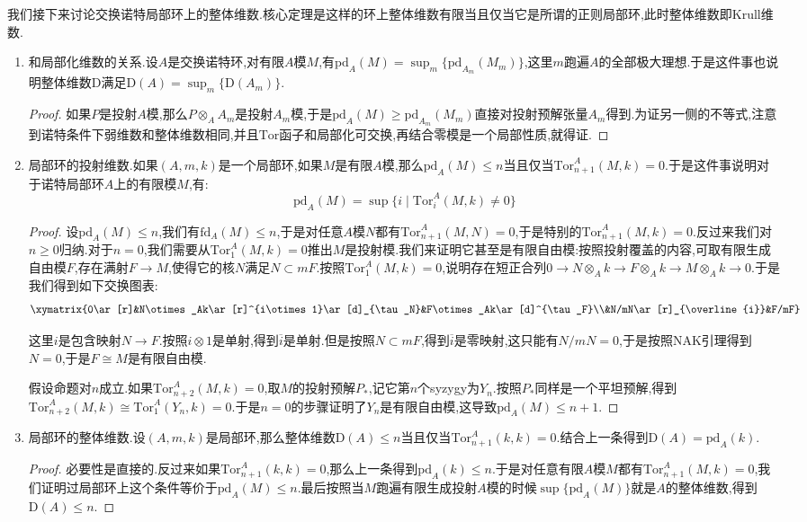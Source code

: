 我们接下来讨论交换诺特局部环上的整体维数.核心定理是这样的环上整体维数有限当且仅当它是所谓的正则局部环,此时整体维数即Krull维数.
\begin{enumerate}
	\item 和局部化维数的关系.设$A$是交换诺特环,对有限$A$模$M$,有$\mathrm{pd}_A(M)=\sup_m\{\mathrm{pd}_{A_m}(M_m)\}$,这里$m$跑遍$A$的全部极大理想.于是这件事也说明整体维数$\mathrm{D}$满足$\mathrm{D}(A)=\sup_m\{\mathrm{D}(A_m)\}$.
	\begin{proof}
		
		如果$P$是投射$A$模,那么$P\otimes_AA_m$是投射$A_m$模,于是$\mathrm{pd}_A(M)\ge\mathrm{pd}_{A_m}(M_m)$直接对投射预解张量$A_m$得到.为证另一侧的不等式,注意到诺特条件下弱维数和整体维数相同,并且$\mathrm{Tor}$函子和局部化可交换,再结合零模是一个局部性质,就得证.
	\end{proof}
    \item 局部环的投射维数.如果$(A,m,k)$是一个局部环,如果$M$是有限$A$模,那么$\mathrm{pd}_A(M)\le n$当且仅当$\mathrm{Tor}_{n+1}^A(M,k)=0$.于是这件事说明对于诺特局部环$A$上的有限模$M$,有:
    $$\mathrm{pd}_A(M)=\sup\{i\mid\mathrm{Tor}_i^A(M,k)\not=0\}$$
    \begin{proof}
    	
    	设$\mathrm{pd}_A(M)\le n$,我们有$\mathrm{fd}_A(M)\le n$,于是对任意$A$模$N$都有$\mathrm{Tor}_{n+1}^A(M,N)=0$,于是特别的$\mathrm{Tor}_{n+1}^A(M,k)=0$.反过来我们对$n\ge0$归纳.对于$n=0$,我们需要从$\mathrm{Tor}_1^A(M,k)=0$推出$M$是投射模.我们来证明它甚至是有限自由模:按照投射覆盖的内容,可取有限生成自由模$F$,存在满射$F\to M$,使得它的核$N$满足$N\subset mF$.按照$\mathrm{Tor}_1^A(M,k)=0$,说明存在短正合列$0\to N\otimes_Ak\to F\otimes_Ak\to M\otimes_Ak\to0$.于是我们得到如下交换图表:
    	$$\xymatrix{0\ar[r]&N\otimes_Ak\ar[r]^{i\otimes1}\ar[d]_{\tau_N}&F\otimes_Ak\ar[d]^{\tau_F}\\&N/mN\ar[r]_{\overline{i}}&F/mF}$$
    	
    	这里$i$是包含映射$N\to F$.按照$i\otimes1$是单射,得到$\overline{i}$是单射.但是按照$N\subset mF$,得到$\overline{i}$是零映射,这只能有$N/mN=0$,于是按照NAK引理得到$N=0$,于是$F\cong M$是有限自由模.
    	
    	假设命题对$n$成立.如果$\mathrm{Tor}_{n+2}^A(M,k)=0$,取$M$的投射预解$P_*$,记它第$n$个syzygy为$Y_n$.按照$P_*$同样是一个平坦预解,得到$\mathrm{Tor}_{n+2}^A(M,k)\cong\mathrm{Tor}_1^A(Y_n,k)=0$.于是$n=0$的步骤证明了$Y_n$是有限自由模,这导致$\mathrm{pd}_A(M)\le n+1$.
    \end{proof}
    \item 局部环的整体维数.设$(A,m,k)$是局部环,那么整体维数$\mathrm{D}(A)\le n$当且仅当$\mathrm{Tor}_{n+1}^A(k,k)=0$.结合上一条得到$\mathrm{D}(A)=\mathrm{pd}_A(k)$.
    \begin{proof}
    	
    	必要性是直接的.反过来如果$\mathrm{Tor}_{n+1}^A(k,k)=0$,那么上一条得到$\mathrm{pd}_A(k)\le n$.于是对任意有限$A$模$M$都有$\mathrm{Tor}_{n+1}^A(M,k)=0$,我们证明过局部环上这个条件等价于$\mathrm{pd}_A(M)\le n$.最后按照当$M$跑遍有限生成投射$A$模的时候$\sup\{\mathrm{pd}_A(M)\}$就是$A$的整体维数,得到$\mathrm{D}(A)\le n$.
    \end{proof}
\end{enumerate}

